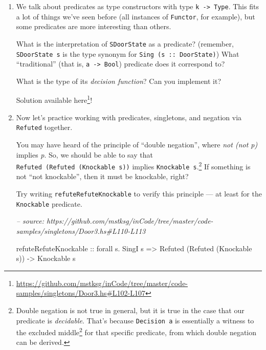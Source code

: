 \documentclass[]{article}
\newenvironment{Shaded}{}{}
\newcommand{\CommentTok}[1]{\textcolor[rgb]{0.38,0.63,0.69}{\textit{#1}}}
\newcommand{\DataTypeTok}[1]{\textcolor[rgb]{0.56,0.13,0.00}{#1}}
\newcommand{\FunctionTok}[1]{\textcolor[rgb]{0.02,0.16,0.49}{#1}}
\newcommand{\NormalTok}[1]{#1}
\newcommand{\OtherTok}[1]{\textcolor[rgb]{0.00,0.44,0.13}{#1}}
\renewcommand{\href}[2]{#2\footnote{\url{#1}}}
\begin{document}
\begin{enumerate}
\def\labelenumi{\arabic{enumi}.}
\item
  We talk about predicates as type constructors with type
  \texttt{k\ -\textgreater{}\ Type}. This fits a lot of things we've seen before
  (all instances of \texttt{Functor}, for example), but some predicates are more
  interesting than others.

  What is the interpretation of \texttt{SDoorState} as a predicate? (remember,
  \texttt{SDoorState\ s} is the type synonym for
  \texttt{Sing\ (s\ ::\ DoorState)}) What ``traditional'' (that is,
  \texttt{a\ -\textgreater{}\ Bool}) predicate does it correspond to?

  What is the type of its \emph{decision function}? Can you implement it?

  Solution available
  \href{https://github.com/mstksg/inCode/tree/master/code-samples/singletons/Door3.hs\#L102-L107}{here}!
\item
  Now let's practice working with predicates, singletons, and negation via
  \texttt{Refuted} together.

  You may have heard of the principle of ``double negation'', where \emph{not
  (not p)} implies \emph{p}. So, we should be able to say that
  \texttt{Refuted\ (Refuted\ (Knockable\ s))} implies
  \texttt{Knockable\ s}.\footnote{Double negation is not true in general, but it
    is true in the case that our predicate is \emph{decidable}. That's because
    \texttt{Decision\ a} is essentially a witness to the
    \href{https://en.wikipedia.org/wiki/Law_of_excluded_middle}{excluded middle}
    for that specific predicate, from which double negation can be derived.} If
  something is not ``not knockable'', then it must be knockable, right?

  Try writing \texttt{refuteRefuteKnockable} to verify this principle --- at
  least for the \texttt{Knockable} predicate.

\begin{Shaded}
\begin{Highlighting}[]
\CommentTok{-- source: https://github.com/mstksg/inCode/tree/master/code-samples/singletons/Door3.hs#L110-L113}

\NormalTok{refuteRefuteKnockable}
\OtherTok{    ::}\NormalTok{ forall s}\FunctionTok{.} \DataTypeTok{SingI}\NormalTok{ s}
    \OtherTok{=>} \DataTypeTok{Refuted}\NormalTok{ (}\DataTypeTok{Refuted}\NormalTok{ (}\DataTypeTok{Knockable}\NormalTok{ s))}
    \OtherTok{->} \DataTypeTok{Knockable}\NormalTok{ s}
\end{Highlighting}
\end{Shaded}


\end{enumerate}
\end{document}
